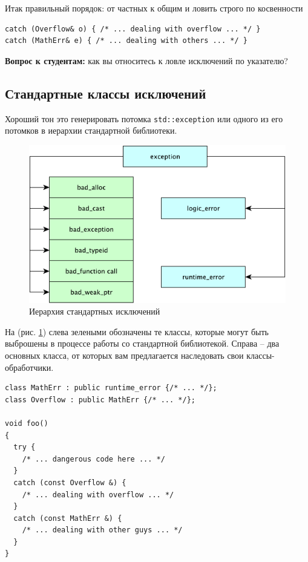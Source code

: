 \documentclass[a4paper,12pt,oneside]{book}
\newif\ifanswers
\begin{document}
Итак правильный порядок: от частных к общим и ловить строго по косвенности

\begin{lstlisting}
catch (Overflow& o) { /* ... dealing with overflow ... */ }
catch (MathErr& e) { /* ... dealing with others ... */ }
\end{lstlisting}

\textbf{Вопрос к студентам:} как вы относитесь к ловле исключений по указателю?

\ifanswers
Правильный ответ: плохо. Возникают сложные проблемы владения выделенным объектом.
\fi

\subsection{Стандартные классы исключений}\label{subsub:stanclasses}

Хороший тон это генерировать потомка \lstinline!std::exception! или одного из его потомков в иерархии стандартной библиотеки.

\begin{figure}[ht]
\centering
\includegraphics[width=1.0\textwidth]{illustrations/exc-hier-crop.pdf}
\caption{Иерархия стандартных исключений}
\label{fig:exc_hier}
\end{figure}

На (рис. \ref{fig:exc_hier}) слева зелеными обозначены те классы, которые могут быть выброшены в процессе работы со стандартной библиотекой. Справа -- два основных класса, от которых вам предлагается наследовать свои классы-обработчики.

\begin{lstlisting}
class MathErr : public runtime_error {/* ... */};
class Overflow : public MathErr {/* ... */};

void foo()
{
  try {
    /* ... dangerous code here ... */
  }
  catch (const Overflow &) {
    /* ... dealing with overflow ... */
  }
  catch (const MathErr &) {
    /* ... dealing with other guys ... */
  }
}
\end{lstlisting}
\end{document}
